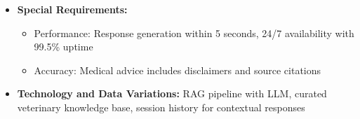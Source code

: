 \begin{itemize}
\begin{itemize}
        \item 4a. LLM confidence below 70\%: System escalates to human veterinarian
        \item 4b. Response timeout: System apologizes and suggests retry
    \end{itemize}
    \item \textbf{Special Requirements:}
    \begin{itemize}
        \item Performance: Response generation within 5 seconds, 24/7 availability with 99.5\% uptime
        \item Accuracy: Medical advice includes disclaimers and source citations
    \end{itemize}
    \item \textbf{Technology and Data Variations:} RAG pipeline with LLM, curated veterinary knowledge base, session history for contextual responses
\end{itemize}

